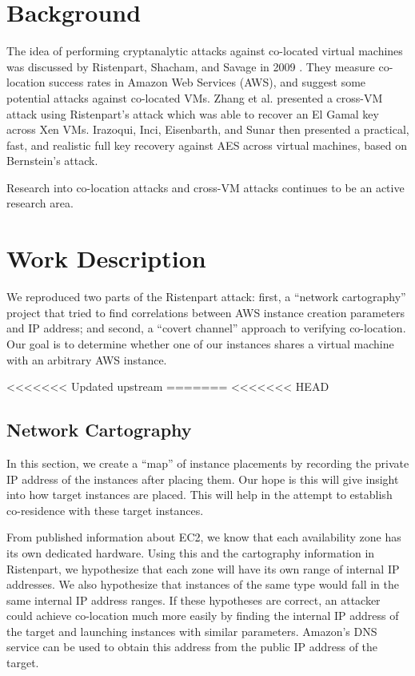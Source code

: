 \documentclass[conference]{IEEEtran}
\begin{document}
\section{Background}\label{sec:background}
The idea of performing cryptanalytic attacks against co-located virtual machines was discussed by Ristenpart, Shacham,
  and Savage in 2009 \cite{ristenpart09}.
They measure co-location success rates in Amazon Web Services (AWS), and suggest some potential attacks against
  co-located VMs.
Zhang \cite{zhang2014cross} et al. presented a cross-VM attack using Ristenpart's attack which was able to recover an El Gamal key across
Xen VMs.
Irazoqui, Inci, Eisenbarth, and Sunar \cite{irazoquis2014wait} then presented a practical, fast, and realistic full key
  recovery against AES across virtual machines, based on Bernstein's \cite{bernstein2005cache} attack.

Research into co-location attacks and cross-VM attacks continues to be an active research area.

\section{Work Description}
We reproduced two parts of the Ristenpart attack: first, a ``network cartography'' project that tried to find
  correlations between AWS instance creation parameters and IP address; and second, a ``covert channel'' approach to
  verifying co-location.
Our goal is to determine whether one of our instances shares a virtual machine with an arbitrary AWS instance.

<<<<<<< Updated upstream
=======
<<<<<<< HEAD
\subsection{Network Cartography}
In this section, we create a “map” of instance placements by recording the private IP address of the instances after placing them.
Our hope is this will give insight into how target instances are placed.
This will help in the attempt to establish co-residence with these target instances.

From published information about EC2, we know that each availability zone has its own dedicated hardware. 
Using this and the cartography information in Ristenpart, we hypothesize that each zone will have its own 
range of internal IP addresses. 
We also hypothesize that instances of the same type would fall in the same internal IP address ranges. 
If these hypotheses are correct, an attacker could achieve co-location much more easily by finding the internal 
IP address of the target and launching instances with similar parameters. 
Amazon’s DNS service can be used to obtain this address from the public IP address of the target.
\end{document}
